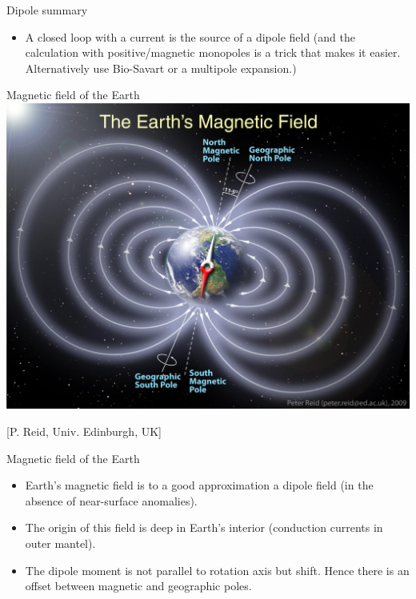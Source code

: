 \begin{frame}
  \begin{PointSix}{Dipole summary}
    \begin{itemize}
      \item A closed loop with a current is the source of a dipole field (and the calculation with positive/magnetic monopoles is a trick that makes it easier. Alternatively use Bio-Savart or a multipole expansion.)
    \end{itemize}
  \end{PointSix}
  \end{frame}

  \begin{frame}
    \begin{PointSix}{Magnetic field of the Earth}
      \includegraphics[width=0.99\linewidth]{Figures/Magnetics/MagneticFieldEarth_PReid_Edinburgh.png}

      \tiny [P. Reid, Univ. Edinburgh, UK]
    \end{PointSix}
  \end{frame}


  \begin{frame}
    \begin{PointSix}{Magnetic field of the Earth}
      \begin{itemize}
        \item Earth's magnetic field is to a good approximation a dipole field (in the absence of near-surface anomalies).
        \item The origin of this field is deep in Earth's interior (conduction currents in outer mantel).
        \item The dipole moment is not parallel to rotation axis but shift. Hence there is an offset between magnetic and geographic poles.
      \end{itemize}
    \end{PointSix}
    \end{frame}

